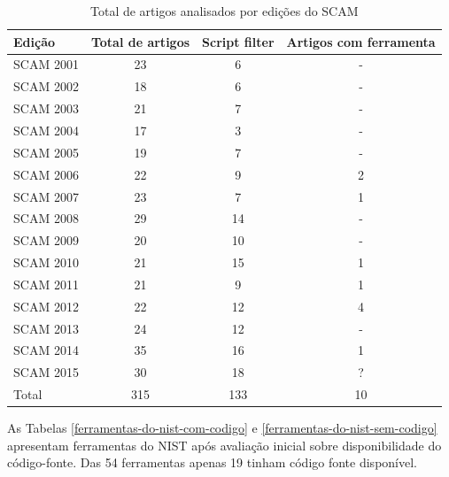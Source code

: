 \documentclass[qual, classic, a4paper]{ufbathesis}
\begin{document}
\begin{table}
\caption{Total de artigos analisados por edições do SCAM}
\centering
\begin{tabular}{| l | c | c | c |}
\hline
Edição    & Total de artigos & Script filter & Artigos com ferramenta \\
\hline
SCAM 2001 & 23               & 6             & -                      \\
SCAM 2002 & 18               & 6             & -                      \\
SCAM 2003 & 21               & 7             & -                      \\
SCAM 2004 & 17               & 3             & -                      \\
SCAM 2005 & 19               & 7             & -                      \\
SCAM 2006 & 22               & 9             & 2                      \\
SCAM 2007 & 23               & 7             & 1                      \\
SCAM 2008 & 29               & 14            & -                      \\
SCAM 2009 & 20               & 10            & -                      \\
SCAM 2010 & 21               & 15            & 1                      \\
SCAM 2011 & 21               & 9             & 1                      \\
SCAM 2012 & 22               & 12            & 4                      \\
SCAM 2013 & 24               & 12            & -                      \\
SCAM 2014 & 35               & 16            & 1                      \\
SCAM 2015 & 30               & 18            & ?                      \\
\hline
Total     & 315              & 133           & 10                     \\
\hline
\end{tabular}
\label{artigos-do-scam}
\end{table}

As Tabelas \ref{ferramentas-do-nist-com-codigo} e
\ref{ferramentas-do-nist-sem-codigo} apresentam ferramentas do NIST após
avaliação inicial sobre disponibilidade do código-fonte. Das 54 ferramentas
apenas 19 tinham código fonte disponível.
\end{document}
